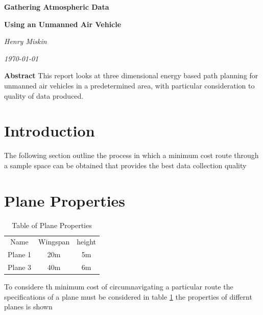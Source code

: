 \documentclass[a4paper,12pt,twoside]{article}
\begin{document}
\onehalfspacing

\begin{titlepage}
\clearpage
\vspace*{\fill}
\begin{center}
\begin{minipage}{.6\textwidth}
\centerline{\textbf{\huge Gathering Atmospheric Data}}
\centerline{\textbf{\large Using an Unmanned Air Vehicle}}
\centerline{\textit{Henry Miskin}}
\centerline{\textit{\today}}
\end{minipage}
\end{center}
\vspace{5cm}
\center
\textbf{Abstract}
\center
This report looks at three dimensional energy based path planning for unmanned air vehicles in a predetermined area, with particular consideration to quality of data produced.
\vfill

\clearpage
\end{titlepage}
\tableofcontents
\clearpage

\section{Introduction}
\label{sec:introduction}

The following section outline the process in which a minimum cost route through a sample space can be obtained that provides the best data collection quality

\section{Plane Properties}
\label{sec:plane_properties}

\begin{table}[width=\textwidth]
\centering
    \begin{tabular}{ccc}
    Name	& Wingspan	& height	\\
Plane 1	& 20m	& 5m	\\
Plane 3	& 40m	& 6m	\\

    \end{tabular}
\caption{Table of Plane Properties}
\label{tbl:table_of_plane_properties}
\end{table}

To considere th minimum cost of circumnavigating a particular route the specifications of a plane must be considered in table \ref{tbl:table_of_plane_properties} the properties of differnt planes is shown
\end{document}
